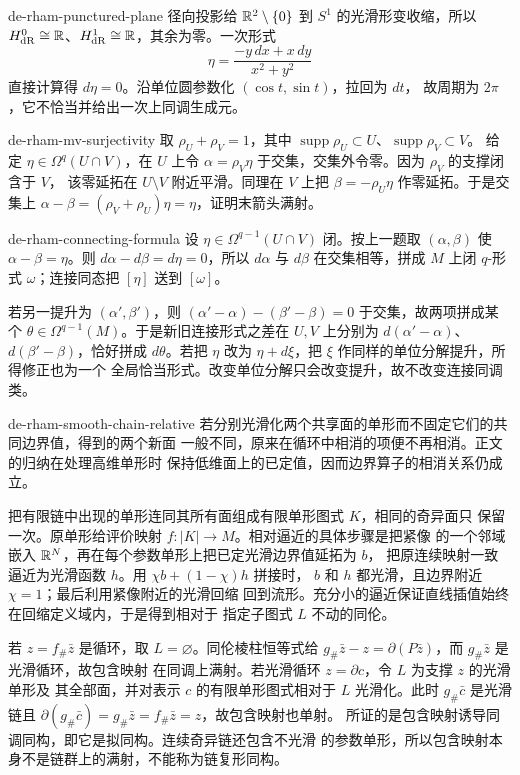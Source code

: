 \begin{solution}{de-rham-punctured-plane}
径向投影给 $\mathbb{R}^2\setminus\{0\}$ 到 $S^1$ 的光滑形变收缩，所以
$H^0_{\rm dR}\cong\mathbb{R}$、$H^1_{\rm dR}\cong\mathbb{R}$，其余为零。一次形式
\[
 \eta=\frac{-y\,dx+x\,dy}{x^2+y^2}
\]
直接计算得 $d\eta=0$。沿单位圆参数化 $(\cos t,\sin t)$，拉回为 $dt$，
故周期为 $2\pi$，它不恰当并给出一次上同调生成元。
\end{solution}

\begin{solution}{de-rham-mv-surjectivity}
取 $\rho_U+\rho_V=1$，其中
$\operatorname{supp}\rho_U\subset U$、$\operatorname{supp}\rho_V\subset V$。
给定 $\eta\in\Omega^q(U\cap V)$，在 $U$ 上令
$\alpha=\rho_V\eta$ 于交集，交集外令零。因为 $\rho_V$ 的支撑闭含于 $V$，
该零延拓在 $U\setminus V$ 附近平滑。同理在 $V$ 上把
$\beta=-\rho_U\eta$ 作零延拓。于是交集上
$\alpha-\beta=(\rho_V+\rho_U)\eta=\eta$，证明末箭头满射。
\end{solution}

\begin{solution}{de-rham-connecting-formula}
设 $\eta\in\Omega^{q-1}(U\cap V)$ 闭。按上一题取
$(\alpha,\beta)$ 使 $\alpha-\beta=\eta$。则
$d\alpha-d\beta=d\eta=0$，所以 $d\alpha$ 与 $d\beta$ 在交集相等，拼成
$M$ 上闭 $q$-形式 $\omega$；连接同态把 $[\eta]$ 送到 $[\omega]$。

若另一提升为 $(\alpha',\beta')$，则
$(\alpha'-\alpha)-(\beta'-\beta)=0$ 于交集，故两项拼成某个
$\theta\in\Omega^{q-1}(M)$。于是新旧连接形式之差在 $U,V$ 上分别为
$d(\alpha'-\alpha)$、$d(\beta'-\beta)$，恰好拼成 $d\theta$。若把
$\eta$ 改为 $\eta+d\xi$，把 $\xi$ 作同样的单位分解提升，所得修正也为一个
全局恰当形式。改变单位分解只会改变提升，故不改变连接同调类。
\end{solution}

\begin{solution}{de-rham-smooth-chain-relative}
若分别光滑化两个共享面的单形而不固定它们的共同边界值，得到的两个新面
一般不同，原来在循环中相消的项便不再相消。正文的归纳在处理高维单形时
保持低维面上的已定值，因而边界算子的相消关系仍成立。

把有限链中出现的单形连同其所有面组成有限单形图式 $K$，相同的奇异面只
保留一次。原单形给评价映射 $f:|K|\to M$。相对逼近的具体步骤是把紧像
的一个邻域嵌入 $\mathbb{R}^N$，再在每个参数单形上把已定光滑边界值延拓为 $b$，
把原连续映射一致逼近为光滑函数 $h$。用 $\chi b+(1-\chi)h$ 拼接时，
$b$ 和 $h$ 都光滑，且边界附近 $\chi=1$；最后利用紧像附近的光滑回缩
回到流形。充分小的逼近保证直线插值始终在回缩定义域内，于是得到相对于
指定子图式 $L$ 不动的同伦。

若 $z=f_\#\bar z$ 是循环，取 $L=\varnothing$。同伦棱柱恒等式给
$g_\#\bar z-z=\partial(P\bar z)$，而 $g_\#\bar z$ 是光滑循环，故包含映射
在同调上满射。若光滑循环 $z=\partial c$，令 $L$ 为支撑 $z$ 的光滑单形及
其全部面，并对表示 $c$ 的有限单形图式相对于 $L$ 光滑化。此时
$g_\#\bar c$ 是光滑链且
$\partial(g_\#\bar c)=g_\#\bar z=f_\#\bar z=z$，故包含映射也单射。
所证的是包含映射诱导同调同构，即它是拟同构。连续奇异链还包含不光滑
的参数单形，所以包含映射本身不是链群上的满射，不能称为链复形同构。
\end{solution}

